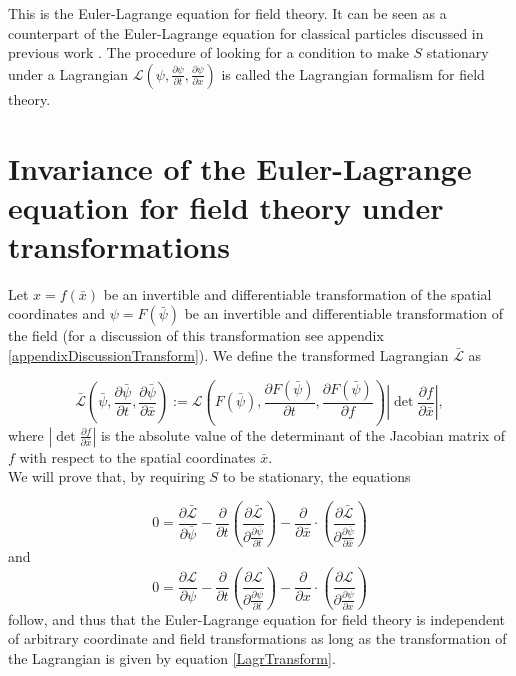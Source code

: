 \documentclass[prb,preprint]{revtex4-1}
\begin{document}
This is the Euler-Lagrange equation for field theory.
It can be seen as a counterpart of the Euler-Lagrange equation for classical particles discussed in previous work \cite{guthrie2019demystifying}.
The procedure of looking for a condition to make $S$ stationary under a Lagrangian $\mathcal{L}\left(\psi, \frac{\partial \psi}{\partial t}, \frac{\partial \psi}{\partial x}\right)$ is called the Lagrangian formalism for field theory.

\section{Invariance of the Euler-Lagrange equation for field theory under transformations} \label{sectionInvariance}

Let $x=f(\bar{x})$ be an invertible and differentiable transformation of the spatial coordinates and $\psi=F(\bar{\psi})$ be an invertible and differentiable transformation of the field (for a discussion of this transformation see appendix \ref{appendixDiscussionTransform}).
We define the transformed Lagrangian  $\bar{\mathcal{L}}$ as

\begin{equation} \label{LagrTransform}
\bar{\mathcal{L}}\left(\bar{\psi}, \frac{\partial \bar{\psi}}{\partial t}, \frac{\partial \bar{\psi}}{\partial \bar{x}}\right) 
:= \mathcal{L}\left(F(\bar{\psi}), \frac{\partial F(\bar{\psi})}{\partial t}, \frac{\partial F(\bar{\psi})}{\partial f}\right) 
\left| \det \frac{\partial f}{\partial \bar{x}} \right|,
\end{equation}
where $\left| \det \frac{\partial f}{\partial \bar{x}} \right|$ is the absolute value of the determinant of the Jacobian matrix of $f$ with respect to the spatial coordinates $\bar{x}$. \\

We will prove that, by requiring $S$ to be stationary, the equations

\begin{equation} \label{ELGTransformed}
0 = \frac{\partial \bar{\mathcal{L}}}{\partial \bar{\psi}}
-\frac{\partial}{\partial t} \left( \frac{\partial \mathcal{\bar{L}}}{\partial \frac{\partial \bar{\psi}}{\partial t}} \right) 
-\frac{\partial}{\partial \bar{x}} \cdot \left( \frac{\partial \mathcal{\bar{L}}}{\partial \frac{\partial \bar{\psi}}{\partial \bar{x}}} \right) 
\end{equation}
and
\begin{equation} \label{ELGUntransformed}
0 = \frac{\partial \mathcal{L}}{\partial \psi}
-\frac{\partial}{\partial t} \left( \frac{\partial \mathcal{L}}{\partial \frac{\partial \psi}{\partial t}} \right) 
-\frac{\partial}{\partial x} \cdot \left( \frac{\partial \mathcal{L}}{\partial \frac{\partial \psi}{\partial x}} \right) 
\end{equation}
follow, and thus that the Euler-Lagrange equation for field theory is independent of arbitrary coordinate and field transformations as long as the transformation of the Lagrangian is given by equation \eqref{LagrTransform}. \\
\end{document}
